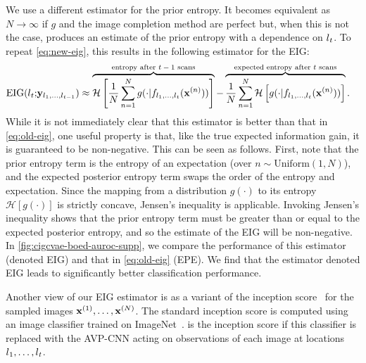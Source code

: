 We use a different estimator for the prior entropy. It becomes equivalent as $N
\rightarrow \infty$ if $g$ and the image completion method are perfect but, when
this is not the case, produces an estimate of the prior entropy with a
dependence on $l{}_t$. To repeat \cref{eq:new-eig}, this results in the following
estimator for the EIG:
\begin{align}
  \label{eq:new-eig-supp}
  \text{EIG}(l{}_t;& {\mathbf{y}}_{l{}_1,\ldots,l{}_{t-1}}) \approx \overbrace{\mathcal{H} \left[ \frac{1}{N} \sum_{n=1}^N g(\cdot|f_{l{}_1,\ldots,l{}_t}({\mathbf{x}}^{(n)})) \right]}^{\text{entropy after $t-1$ scans}} - \overbrace{\frac{1}{N} \sum_{n=1}^N  \mathcal{H} \left[ g(\cdot|f_{l{}_1,\ldots,l{}_t}({\mathbf{x}}^{(n)})) \right]}^{\text{expected entropy after $t$ scans}}.
\end{align}
While it is not immediately clear that this estimator is better than that in
\cref{eq:old-eig}, one useful property is that, like the true expected
information gain, it is guaranteed to be non-negative. This can be seen as
follows. First, note that the prior entropy term is the entropy of an
expectation (over $n \sim \text{Uniform}(1, N)$), and the expected posterior
entropy term swaps the order of the entropy and expectation. Since the mapping
from a distribution $g(\cdot)$ to its entropy $\mathcal{H}[g(\cdot)]$ is
strictly concave, Jensen's inequality is applicable. Invoking Jensen's
inequality shows that the prior entropy term must be greater than or equal to
the expected posterior entropy, and so the estimate of the EIG will be
non-negative. In \cref{fig:cigcvae-boed-auroc-supp}, we compare the performance of this
estimator (denoted EIG) and that in \cref{eq:old-eig} (EPE). We find that the
estimator denoted EIG leads to significantly better classification performance.

Another view of our EIG estimator is as a variant of the inception
score~\citep{salimans2016improved} for the sampled images
${\mathbf{x}}^{(1)},\ldots,{\mathbf{x}}^{(N)}$. The standard inception score is computed using
an image classifier trained on ImageNet~\citep{salimans2016improved}.
 is the inception score if this classifier is replaced with the
AVP-CNN acting on observations of each image at locations $l{}_1,\ldots,l{}_t$.

